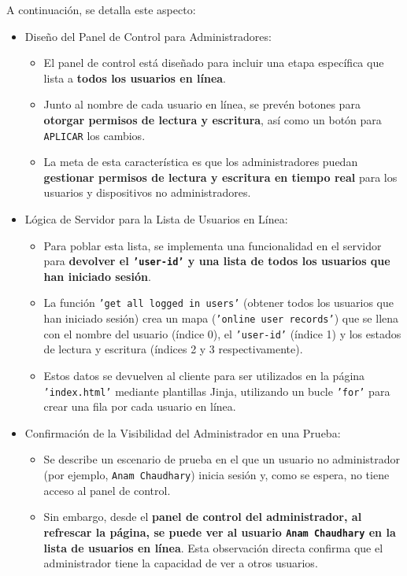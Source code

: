 \documentclass{report}
\begin{document}
A continuación, se detalla este aspecto:
\begin{itemize}
    \item Diseño del Panel de Control para Administradores:
    \begin{itemize}
        \item El panel de control está diseñado para incluir una etapa específica que lista a \textbf{todos los usuarios en línea}.
        \item Junto al nombre de cada usuario en línea, se prevén botones para \textbf{otorgar permisos de lectura y escritura}, así como un botón 
              para \texttt{APLICAR} los cambios.
        \item La meta de esta característica es que los administradores puedan \textbf{gestionar permisos de lectura y escritura en tiempo real} para 
              los usuarios y dispositivos no administradores.
    \end{itemize}
    
    \item Lógica de Servidor para la Lista de Usuarios en Línea:
    \begin{itemize}
        \item Para poblar esta lista, se implementa una funcionalidad en el servidor para \textbf{devolver el \texttt{'user-id'} y una lista de todos los 
              usuarios que han iniciado sesión}.
        \item La función \texttt{'get all logged in users'} (obtener todos los usuarios que han iniciado sesión) crea un mapa (\texttt{'online user records'}) 
              que se llena con el nombre del usuario (índice 0), el \texttt{'user-id'} (índice 1) y los estados de lectura y escritura (índices 2 y 3 
              respectivamente).
        \item Estos datos se devuelven al cliente para ser utilizados en la página \texttt{'index.html'} mediante plantillas Jinja, utilizando un 
              bucle \texttt{'for'} para crear una fila por cada usuario en línea.
    \end{itemize}
    
    \item Confirmación de la Visibilidad del Administrador en una Prueba:
    \begin{itemize}
        \item Se describe un escenario de prueba en el que un usuario no administrador (por ejemplo, \texttt{Anam Chaudhary}) inicia sesión 
              y, como se espera, no tiene acceso al panel de control.
        \item Sin embargo, desde el \textbf{panel de control del administrador, al refrescar la página, se puede ver al usuario \texttt{Anam Chaudhary} 
              en la lista de usuarios en línea}. Esta observación directa confirma que el administrador tiene la capacidad de ver a otros usuarios.
    \end{itemize}


\end{itemize}
\end{document}
